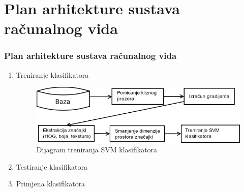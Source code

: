 \documentclass{beamer}
\begin{document}
\section{Plan arhitekture sustava računalnog vida}
\begin{frame}
\frametitle{Plan arhitekture sustava računalnog vida}
\begin{enumerate}
\item Treniranje klasifikatora
\begin{figure}[h!]
\center
\includegraphics[scale=0.5]{img/treniranje.png}
\caption{Dijagram treniranja SVM klasifikatora}
\label{treniranje}
\end{figure}
\item Testiranje klasifikatora
\item Primjena klasifikatora
\end{enumerate}
\end{frame}

\begin{frame}
\small


\end{frame}
\end{document}
